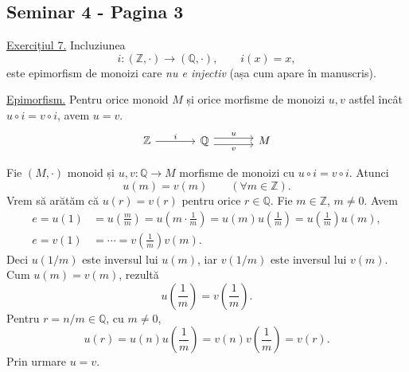 
\subsection*{Seminar 4 - Pagina 3}

\noindent\underline{Exercițiul 7.}
Incluziunea
\[
 i:(\mathbb Z,\cdot)\longrightarrow(\mathbb Q,\cdot),
 \qquad i(x)=x,
\]
este epimorfism de monoizi care \emph{nu e injectiv}
(așa cum apare în manuscris).

\smallskip
\noindent\underline{Epimorfism.}
Pentru orice monoid $M$ și orice morfisme de monoizi $u,v$
astfel încât $u\circ i=v\circ i$, avem $u=v$.
\[
\begin{tikzcd}[column sep=large]
 \mathbb Z \arrow[r,"i"] &
 \mathbb Q \arrow[r,shift left=.7ex,"u"]
            \arrow[r,shift right=.7ex,swap,"v"] & M
\end{tikzcd}
\]

\noindent Fie $(M,\cdot)$ monoid și $u,v:\mathbb Q\to M$
morfisme de monoizi cu $u\circ i=v\circ i$. Atunci
\[
 u(m)=v(m)\qquad(\forall m\in\mathbb Z).
\]
Vrem să arătăm că $u(r)=v(r)$ pentru orice $r\in\mathbb Q$.
Fie $m\in\mathbb Z$, $m\ne0$. Avem
\[
\begin{aligned}
 e=u(1)
  &=u\!\left(\frac{m}{m}\right)
   =u\!\left(m\cdot\frac1m\right)
   =u(m)u\!\left(\frac1m\right)
   =u\!\left(\frac1m\right)u(m),\\
 e=v(1)
  &=\cdots
   =v\!\left(\frac1m\right)v(m).
\end{aligned}
\]
Deci $u(1/m)$ este inversul lui $u(m)$, iar $v(1/m)$ este
inversul lui $v(m)$. Cum $u(m)=v(m)$, rezultă
\[
 u\!\left(\frac1m\right)=v\!\left(\frac1m\right).
\]
Pentru $r=n/m\in\mathbb Q$, cu $m\ne0$,
\[
 u(r)=u(n)u\!\left(\frac1m\right)
     =v(n)v\!\left(\frac1m\right)=v(r).
\]
Prin urmare $u=v$.

